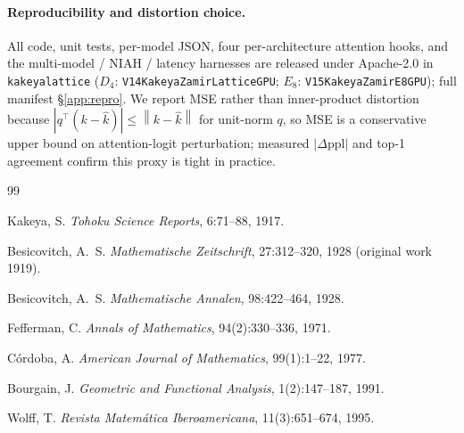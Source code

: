 \documentclass[10pt,a4paper]{article}
\theoremstyle{definition}
\theoremstyle{plain}
\newcommand{\norm}[1]{\left\lVert#1\right\rVert}
\begin{document}
\paragraph{Reproducibility and distortion choice.}
All code, unit tests, per-model JSON, four per-architecture
attention hooks, and the multi-model / NIAH / latency harnesses
are released under Apache-2.0 in \texttt{kakeyalattice}
($D_4$: \texttt{V14KakeyaZamirLatticeGPU};
$E_8$: \texttt{V15KakeyaZamirE8GPU}); full manifest
\S\ref{app:repro}. We report MSE rather than inner-product
distortion because $|q^\top(k-\hat k)| \leq \norm{k-\hat k}$ for
unit-norm $q$, so MSE is a conservative upper bound on
attention-logit perturbation; measured $|\Delta\mathrm{ppl}|$ and
top-1 agreement confirm this proxy is tight in practice.
\label{sec:mse-discussion}

\begin{thebibliography}{99}


Kakeya, S.
\newblock \emph{Tohoku Science Reports}, 6:71--88, 1917.

Besicovitch, A.~S.
\newblock \emph{Mathematische Zeitschrift}, 27:312--320, 1928 (original work 1919).

Besicovitch, A.~S.
\newblock \emph{Mathematische Annalen}, 98:422--464, 1928.

Fefferman, C.
\newblock \emph{Annals of Mathematics}, 94(2):330--336, 1971.

C\'ordoba, A.
\newblock \emph{American Journal of Mathematics}, 99(1):1--22, 1977.

Bourgain, J.
\newblock \emph{Geometric and Functional Analysis}, 1(2):147--187, 1991.

Wolff, T.
\newblock \emph{Revista Matem\'atica Iberoamericana}, 11(3):651--674, 1995.


\end{thebibliography}
\end{document}
